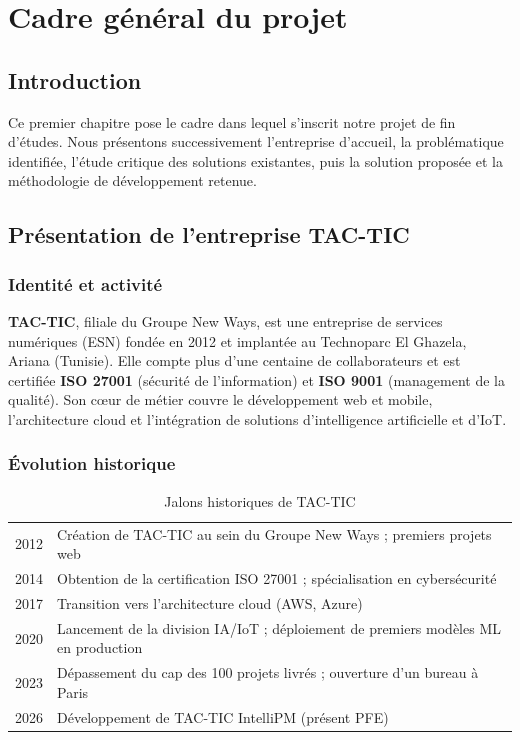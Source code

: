 \chapter{Cadre général du projet}

\section*{Introduction}
Ce premier chapitre pose le cadre dans lequel s'inscrit notre projet de fin d'études.
Nous présentons successivement l'entreprise d'accueil, la problématique identifiée,
l'étude critique des solutions existantes, puis la solution proposée et la méthodologie
de développement retenue.

\section{Présentation de l'entreprise TAC-TIC}

\subsection{Identité et activité}

\textbf{TAC-TIC}, filiale du Groupe New Ways, est une entreprise de services
numériques (ESN) fondée en 2012 et implantée au Technoparc El Ghazela, Ariana
(Tunisie). Elle compte plus d'une centaine de collaborateurs et est certifiée
\textbf{ISO 27001} (sécurité de l'information) et \textbf{ISO 9001} (management
de la qualité). Son cœur de métier couvre le développement web et mobile,
l'architecture cloud et l'intégration de solutions d'intelligence artificielle
et d'IoT.

\subsection{Évolution historique}

\begin{table}[H]
  \centering
  \caption{Jalons historiques de TAC-TIC}
  \label{tab:historique_tactic}
  \begin{tabularx}{\textwidth}{C{2cm}X}
    \toprule
     &  \\
    \midrule
    2012 & Création de TAC-TIC au sein du Groupe New Ways ; premiers projets web \\
    2014 & Obtention de la certification ISO 27001 ; spécialisation en cybersécurité \\
    2017 & Transition vers l'architecture cloud (AWS, Azure) \\
    2020 & Lancement de la division IA/IoT ; déploiement de premiers modèles ML en production \\
    2023 & Dépassement du cap des 100 projets livrés ; ouverture d'un bureau à Paris \\
    2026 & Développement de TAC-TIC IntelliPM (présent PFE) \\
    \bottomrule
  \end{tabularx}
\end{table}

